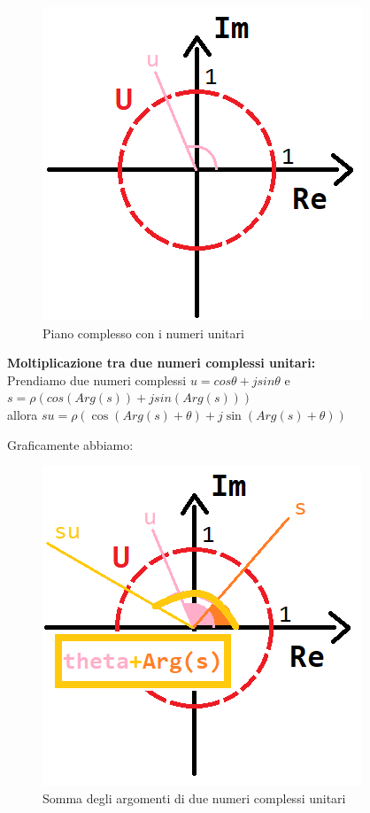 \begin{figure}[h]
	\centering
	\includegraphics[scale=0.5]{immagini/pianoComplessoUnitari}
	\caption{ Piano complesso con i numeri unitari }
	\label{fig: piano complesso unitari}
\end{figure}

\textbf{Moltiplicazione tra due numeri complessi unitari:} \\
Prendiamo due numeri complessi $ u = cos\theta +j sin\theta $ e $ s = \rho ( cos( Arg(s) ) + j sin ( Arg(s) ) ) $ \\
allora $ s u = \rho ( \cos ( Arg(s) + \theta) + j \sin (Arg(s) + \theta) ) $

Graficamente abbiamo:
\begin{figure}[h]
	\centering
	\includegraphics[scale=0.5]{immagini/ComplessiUnitariMoltiplicazioni}
	\caption{ Somma degli argomenti di due numeri complessi unitari }
	\label{fig: complesso unitari moltiplicazioni}
\end{figure}

